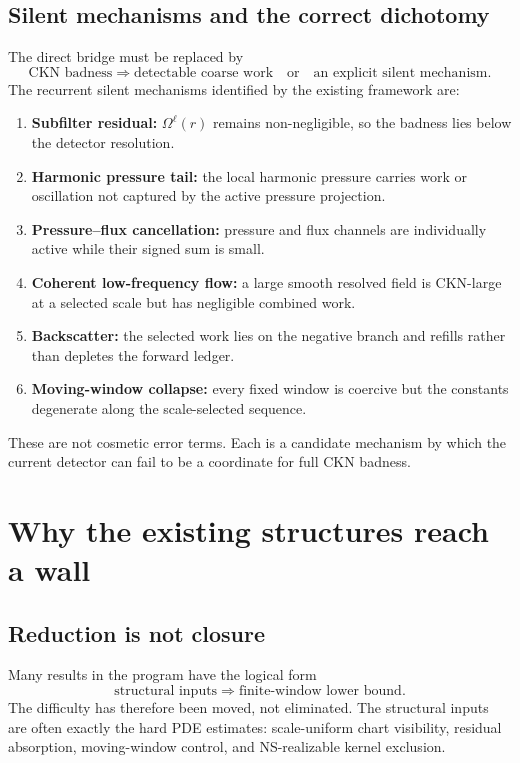 \documentclass[11pt]{article}
\numberwithin{equation}{section}
\theoremstyle{remark}
\begin{document}
\subsection{Silent mechanisms and the correct dichotomy}

The direct bridge must be replaced by
\begin{equation}\label{eq:dichotomy}
\boxed{
\text{CKN badness}
\Longrightarrow
\text{detectable coarse work}
\quad\text{or}\quad
\text{an explicit silent mechanism}.
}
\end{equation}
The recurrent silent mechanisms identified by the existing framework are:
\begin{enumerate}
\item \textbf{Subfilter residual:} $\Omega^\ell(r)$ remains non-negligible, so the badness lies below the detector resolution.
\item \textbf{Harmonic pressure tail:} the local harmonic pressure carries work or oscillation not captured by the active pressure projection.
\item \textbf{Pressure--flux cancellation:} pressure and flux channels are individually active while their signed sum is small.
\item \textbf{Coherent low-frequency flow:} a large smooth resolved field is CKN-large at a selected scale but has negligible combined work.
\item \textbf{Backscatter:} the selected work lies on the negative branch and refills rather than depletes the forward ledger.
\item \textbf{Moving-window collapse:} every fixed window is coercive but the constants degenerate along the scale-selected sequence.
\end{enumerate}
These are not cosmetic error terms. Each is a candidate mechanism by which the current detector can fail to be a coordinate for full CKN badness.

\section{Why the existing structures reach a wall}\label{sec:wall}

\subsection{Reduction is not closure}

Many results in the program have the logical form
\begin{equation}\label{eq:interface-form}
\text{structural inputs}
\Longrightarrow
\text{finite-window lower bound}.
\end{equation}
The difficulty has therefore been moved, not eliminated. The structural inputs are often exactly the hard PDE estimates: scale-uniform chart visibility, residual absorption, moving-window control, and NS-realizable kernel exclusion.
\end{document}
